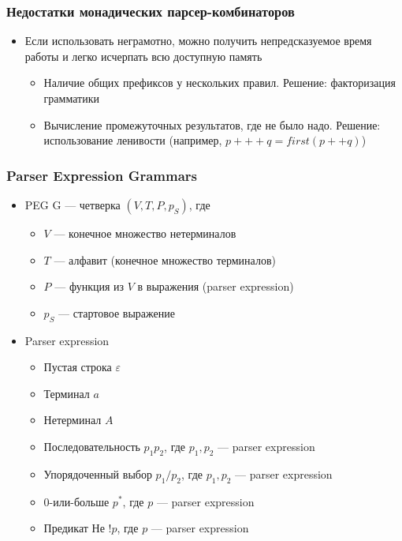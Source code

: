 \documentclass{beamer}
\begin{document}
\begin{frame}[fragile]
  \transwipe[direction=90]
  \frametitle{Недостатки монадических парсер-комбинаторов}
  \begin{itemize}
    \item Если использовать неграмотно, можно получить непредсказуемое время 
работы и легко исчерпать всю доступную память
    \begin{itemize}
      \item Наличие общих префиксов у нескольких правил. Решение: факторизация грамматики
      \item Вычисление промежуточных результатов, где не было надо. Решение: использование ленивости (например, $p +++ q = first (p ++ q)$)
    \end{itemize}
  \end{itemize}
\end{frame}


\begin{frame}[fragile]
  \transwipe[direction=90]
  \frametitle{Parser Expression Grammars}
\begin{itemize}
  \item PEG G --- четверка $(V, T, P, p_S)$, где 
    \begin{itemize}
      \item $V$ --- конечное множество нетерминалов
      \item $T$ --- алфавит (конечное множество терминалов) 
      \item $P$ --- функция из $V$ в выражения (parser expression) 
      \item $p_S$ --- стартовое выражение
    \end{itemize}
\end{itemize}
\begin{itemize}
  \item Parser expression
  \begin{itemize}
    \item Пустая строка $\varepsilon$
    \item Терминал $a$
    \item Нетерминал $A$
    \item Последовательность $p_1 p_2$, где $p_1, p_2$ --- parser expression
    \item Упорядоченный выбор $p_1 / p_2$, где $p_1, p_2$ --- parser expression
    \item 0-или-больше $p^*$, где $p$ --- parser expression
    \item Предикат Не $!p$, где $p$ --- parser expression
  \end{itemize}
\end{itemize}
\end{frame}
\end{document}
